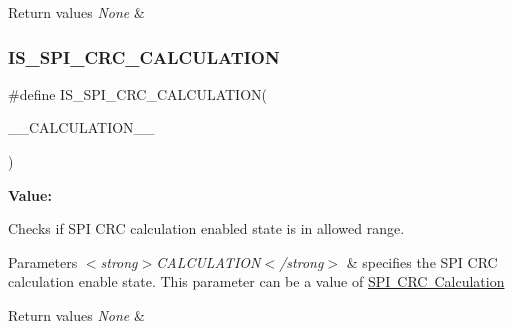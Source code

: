 \begin{DoxyRetVals}{Return values}
{\em None} & \\
\hline
\end{DoxyRetVals}
\mbox{\label{group___s_p_i___private___macros_ga5416429a2e9024b142c972eacb1fd021}} 
\subsubsection{\texorpdfstring{IS\_SPI\_CRC\_CALCULATION}{IS\_SPI\_CRC\_CALCULATION}}
{\footnotesize\ttfamily \#define I\+S\+\_\+\+S\+P\+I\+\_\+\+C\+R\+C\+\_\+\+C\+A\+L\+C\+U\+L\+A\+T\+I\+ON(\begin{DoxyParamCaption}\item[{}]{\+\_\+\+\_\+\+C\+A\+L\+C\+U\+L\+A\+T\+I\+O\+N\+\_\+\+\_\+ }\end{DoxyParamCaption})}

{\bfseries Value\+:}
\begin{DoxyCode}{0}

\end{DoxyCode}


Checks if S\+PI C\+RC calculation enabled state is in allowed range. 


\begin{DoxyParams}{Parameters}
{\em $<$strong$>$\+C\+A\+L\+C\+U\+L\+A\+T\+I\+O\+N$<$/strong$>$} & specifies the S\+PI C\+RC calculation enable state. This parameter can be a value of \mbox{\hyperlink{group___s_p_i___c_r_c___calculation}{S\+PI C\+RC Calculation}} \\
\hline
\end{DoxyParams}

\begin{DoxyRetVals}{Return values}
{\em None} & \\
\hline
\end{DoxyRetVals}
\mbox{\label{group___s_p_i___private___macros_ga772f85d2cf9be95f50c9b9526462a85e}} 

